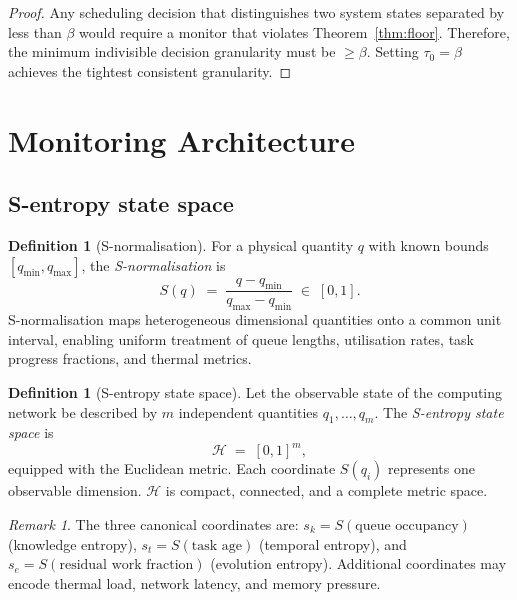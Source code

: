 \documentclass[11pt,twocolumn,a4paper]{article}
\theoremstyle{plain}
\theoremstyle{definition}
\newtheorem{definition}[theorem]{Definition}
\theoremstyle{remark}
\newtheorem{remark}[theorem]{Remark}
\renewcommand{\H}{\mathcal{H}}
\newcommand{\tick}{\tau_0}
\newcommand{\floor}{\beta}
\newcommand{\Scal}{S}
\begin{document}
\begin{proof}
Any scheduling decision that distinguishes two system states separated by less than $\floor$ would require a monitor that violates Theorem~\ref{thm:floor}. Therefore, the minimum indivisible decision granularity must be $\geq \floor$. Setting $\tick = \floor$ achieves the tightest consistent granularity.
\end{proof}

\section{Monitoring Architecture}
\label{sec:monitor}

\subsection{S-entropy state space}

\begin{definition}[S-normalisation]
\label{def:snorm}
For a physical quantity $q$ with known bounds $[q_{\min}, q_{\max}]$, the \emph{S-normalisation} is
\[
  \Scal(q) \;=\; \frac{q - q_{\min}}{q_{\max} - q_{\min}} \;\in\; [0,1].
\]
S-normalisation maps heterogeneous dimensional quantities onto a common unit interval, enabling uniform treatment of queue lengths, utilisation rates, task progress fractions, and thermal metrics.
\end{definition}

\begin{definition}[S-entropy state space]
\label{def:sspace}
Let the observable state of the computing network be described by $m$ independent quantities $q_1, \ldots, q_m$. The \emph{S-entropy state space} is
\[
  \H \;=\; [0,1]^m,
\]
equipped with the Euclidean metric. Each coordinate $\Scal(q_i)$ represents one observable dimension. $\H$ is compact, connected, and a complete metric space.
\end{definition}

\begin{remark}
The three canonical coordinates are: $s_k = \Scal(\text{queue occupancy})$ (knowledge entropy), $s_t = \Scal(\text{task age})$ (temporal entropy), and $s_e = \Scal(\text{residual work fraction})$ (evolution entropy). Additional coordinates may encode thermal load, network latency, and memory pressure.
\end{remark}
\end{document}
